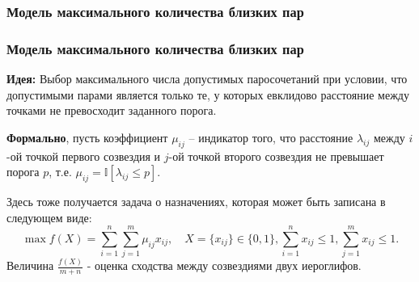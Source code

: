 \subsubsection{Модель максимального количества близких пар}

\begin{frame}
    \frametitle{Модель максимального количества близких пар}
    \textbf{Идея:} Выбор максимального числа допустимых паросочетаний при условии, что допустимыми парами является только те, у которых евклидово расстояние между точками не превосходит заданного порога.

    \textbf{Формально}, пусть коэффициент $\mu_{ij}$ – индикатор того, что расстояние $\lambda_{ij}$ между $i$-ой точкой первого созвездия и $j$-ой точкой второго созвездия не превышает порога $p$, т.е. $\mu_{ij}=\mathbb{I}[\lambda_{ij}\le p]$.

    Здесь тоже получается задача о назначениях, которая может быть записана в следующем виде:
    \[
        \max f(X) = \sum_{i=1}^{n}\sum_{j=1}^{m}\mu_{ij}x_{ij}, \quad X =\{x_{ij}\} \in \{0,1\}, \sum_{i=1}^{n}x_{ij}\le 1, \sum_{j=1}^{m}x_{ij}\le 1.
    \]
    Величина $\frac{f(X)}{m+n}$ - оценка сходства между созвездиями двух иероглифов.
\end{frame}

